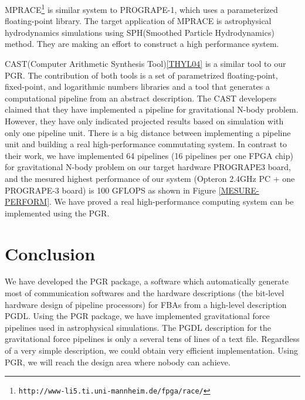 \documentclass{llncs}
\begin{document}
MPRACE\footnote{\tt http://www-li5.ti.uni-mannheim.de/fpga/race/} is
similar system to PROGRAPE-1, which uses a parameterized
floating-point library\cite{GKM02}.  The target application of MPRACE
is astrophysical hydrodynamics simulations using SPH(Smoothed Particle
Hydrodynamics) method.  They are making an effort to construct a high
performance system.


CAST(Computer Arithmetic Synthesis Tool)\ref{THYL04} is a similar tool
to our PGR.  The contribution of both tools is a set of parametrized
floating-point, fixed-point, and logarithmic numbers libraries and a
tool that generates a computational pipeline from an abstract description.
The CAST developers claimed that they have implemented
a pipeline for gravitational N-body problem. 
However, they have only indicated 
projected results based on simulation with only one pipeline unit.
There is a big distance between implementing a pipeline unit and building a real
high-performance commutating system. In contrast to their work,
we have implemented 64 pipelines (16 pipelines per one FPGA chip)
for gravitational N-body problem on our target hardware PROGRAPE3 board,
and the mesured highest performance of our system
(Opteron 2.4GHz PC + one PROGRAPE-3 board) is 100 GFLOPS as shown in Figure \ref{MESURE-PERFORM}.
We have proved a real high-performance computing system
can be implemented using the PGR.


\section{Conclusion}
We have developed the PGR package, a software which automatically generate
most of communication softwares and the hardware descriptions
(the bit-level hardware design of pipeline processors)
for FBAs from a high-level description PGDL.
Using the PGR package, we have implemented gravitational force
pipelines used in astrophysical simulations.
The PGDL description for the gravitational force pipelines
is only a several tens of lines of a text file.
Regardless of a very simple description, we could obtain very
efficient implementation. 
Using PGR, we will reach the design area where nobody can achieve.
\end{document}

